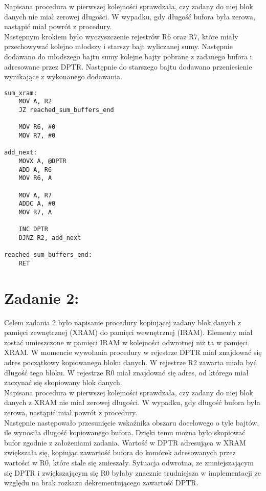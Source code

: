 \documentclass[a4paper,12pt]{article}
\begin{document}
\noindent
Napisana procedura w pierwszej kolejności sprawdzała, czy zadany do niej blok danych nie miał zerowej długości. W wypadku, gdy długość bufora była zerowa, nastąpić miał powrót z procedury.\\

\noindent
Następnym krokiem było wyczyszczenie rejestrów R6 oraz R7, które miały przechowywać kolejno młodszy i starszy bajt wyliczanej sumy. Następnie dodawano do młodszego bajtu sumy kolejne bajty pobrane z zadanego bufora i adresowane przez DPTR. Następnie do starszego bajtu dodawano przeniesienie wynikające z wykonanego dodawania.\\

\begin{lstlisting}[frame=single, basicstyle=\small, caption={Kod z zadania 1}, label={lst.zad1}]
sum_xram:
	MOV A, R2
	JZ reached_sum_buffers_end
	
	MOV R6, #0
	MOV R7, #0
	
add_next:
	MOVX A, @DPTR
	ADD A, R6
	MOV R6, A
	
	MOV A, R7
	ADDC A, #0
	MOV R7, A
	
	INC DPTR
	DJNZ R2, add_next

reached_sum_buffers_end:
	RET
\end{lstlisting}
\vspace{5mm}

\section{Zadanie 2:}
Celem zadania 2 było napisanie procedury kopiującej zadany blok danych z pamięci zewnętrznej (XRAM) do pamięci wewnętrznej (IRAM). Elementy miał zostać umieszczone w pamięci IRAM w kolejności odwrotnej niż ta w pamięci XRAM.  W momencie wywołania procedury w rejestrze DPTR miał znajdować się adres początkowy kopiowanego bloku danych. W rejestrze R2 zawarta miała być długość tego bloku. W rejestrze R0 miał znajdować się adres, od którego miał zaczynać się skopiowany blok danych.\\

\noindent
Napisana procedura w pierwszej kolejności sprawdzała, czy zadany do niej blok danych z XRAM nie miał zerowej długości. W wypadku, gdy długość bufora była zerowa, nastąpić miał powrót z procedury.\\

\noindent
Następnie następowało przesunięcie wskaźnika obszaru docelowego o tyle bajtów, ile wynosiła długość kopiowanego bufora. Dzięki temu można było skopiować bufor zgodnie z założeniami zadania. Wartość w DPTR adresująca w XRAM zwiększała się, kopiując zawartość bufora do komórek adresowanych przez wartości w R0, które stale się zmieszały. Sytuacja odwrotna, ze zmniejszającym się DPTR i zwiększającym się R0 byłaby znacznie trudniejsza w implementacji ze względu na brak rozkazu dekrementującego zawartość DPTR.\\
\end{document}
